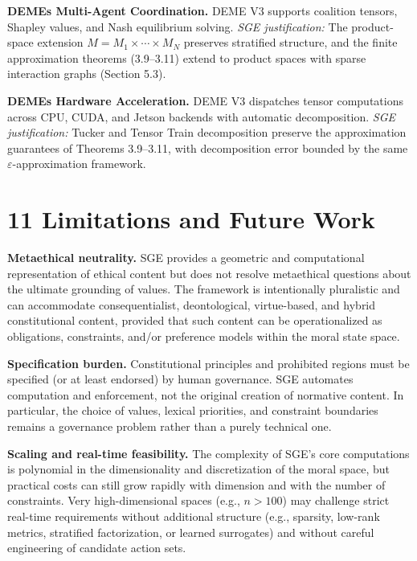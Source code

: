 \documentclass[12pt]{article}
\theoremstyle{plain}
\theoremstyle{definition}
\theoremstyle{remark}
\begin{document}
\textbf{DEME\textquotesingle s Multi-Agent Coordination.} DEME V3
supports coalition tensors, Shapley values, and Nash equilibrium solving.
\emph{SGE justification:} The product-space extension
$M = M_1 \times \cdots \times M_N$ preserves stratified structure, and
the finite approximation theorems (3.9--3.11) extend to product spaces
with sparse interaction graphs (Section 5.3).

\textbf{DEME\textquotesingle s Hardware Acceleration.} DEME V3
dispatches tensor computations across CPU, CUDA, and Jetson backends
with automatic decomposition. \emph{SGE justification:} Tucker and
Tensor Train decomposition preserve the approximation guarantees of
Theorems 3.9--3.11, with decomposition error bounded by the same
$\varepsilon$-approximation framework.

\section{11 Limitations and Future
Work}\label{limitations-and-future-work}

\textbf{Metaethical neutrality.} SGE provides a geometric and
computational representation of ethical content but does not resolve
metaethical questions about the ultimate grounding of values. The
framework is intentionally pluralistic and can accommodate
consequentialist, deontological, virtue-based, and hybrid constitutional
content, provided that such content can be operationalized as
obligations, constraints, and/or preference models within the moral
state space.

\textbf{Specification burden.} Constitutional principles and prohibited
regions must be specified (or at least endorsed) by human governance.
SGE automates computation and enforcement, not the original creation of
normative content. In particular, the choice of values, lexical
priorities, and constraint boundaries remains a governance problem
rather than a purely technical one.

\textbf{Scaling and real-time feasibility.} The complexity of SGE's core
computations is polynomial in the dimensionality and discretization of
the moral space, but practical costs can still grow rapidly with
dimension and with the number of constraints. Very high-dimensional
spaces (e.g., \(n > 100\)) may challenge strict real-time requirements
without additional structure (e.g., sparsity, low-rank metrics,
stratified factorization, or learned surrogates) and without careful
engineering of candidate action sets.
\end{document}
